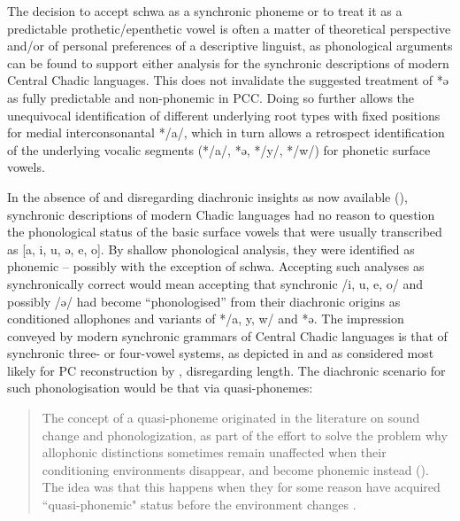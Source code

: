 \documentclass[output=paper]{langscibook}
\begin{document}
The decision to accept schwa as a synchronic phoneme or to treat it as a predictable prothetic\slash epenthetic vowel is often a matter of theoretical perspective and/or of personal preferences of a descriptive linguist, as phonological arguments can be found to support either analysis for the synchronic descriptions of modern Central Chadic languages. This does not invalidate the suggested treatment of *ə as fully predictable and non-phonemic in PCC. Doing so further allows the unequivocal identification of different underlying root types with fixed positions for medial interconsonantal */a/, which in turn allows a retrospect identification of the underlying vocalic segments (*/a/, *ə, */y/, */w/) for phonetic surface vowels. 

In the absence of and disregarding diachronic insights as now available (\citealt{Wolff2022a, Wolffinpressb}), synchronic descriptions of modern Chadic languages had no reason to question the phonological status of the basic surface vowels that were usually transcribed as [a, i, u, ə, e, o]. By shallow phonological analysis, they were identified as phonemic – possibly with the exception of schwa. Accepting such analyses as synchronically correct would mean accepting that synchronic /i, u, e, o/ and possibly /ə/ had become ``phonologised'' from their diachronic origins as conditioned allophones and variants of */a, y, w/ and *ə. The impression conveyed by modern synchronic grammars of Central Chadic languages is that of synchronic three- or four-vowel systems, as depicted in  and as considered most likely for PC reconstruction by \citealt{Newman1977, Newman2006}, disregarding length. The diachronic scenario for such phonologisation would be that via quasi-phonemes:

\begin{quote}
The concept of a quasi-phoneme originated in the literature on sound change and phonologization, as part of the effort to solve the problem why allophonic distinctions sometimes remain unaffected when their conditioning environments disappear, and become phonemic instead (\citealt{Ebeling1960, Korhonen1969, Janda2003}). The idea was that this happens when they for some reason have acquired “quasi-phonemic" status before the environment changes \citep[66]{Kiparsky2018}.
\end{quote}
\end{document}
